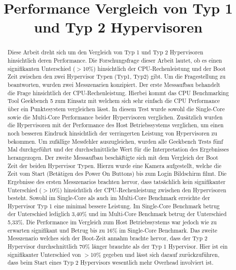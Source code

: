 \documentclass[conference]{IEEEtran}
\begin{document}
\title{Performance Vergleich von Typ 1 und Typ 2 Hypervisoren }

\author
{
}

\maketitle

\begin{abstract}
Diese Arbeit dreht sich um den Vergleich von Typ 1 und Typ 2 Hypervisoren hinsichtlich deren Performance. Die Forschungsfrage dieser Arbeit lautet, ob es einen signifikanten Unterschied ($>$10\%) hinsichtlich der CPU-Rechenleistung und der Boot Zeit zwischen den zwei Hypervisor Typen (Typ1, Typ2) gibt.
Um die Fragestellung zu beantworten, wurden zwei Messzenarien konzipiert. Der erste Messaufbau behandelt die Frage hinsichtlich der CPU-Rechenleistung. Hierbei kommt das CPU Benchmarking Tool Geekbench 5 zum Einsatz mit welchem sich sehr einfach die CPU Performance über ein Punktesystem vergleichen lässt. In diesem Test wurde sowohl die Single-Core sowie die Multi-Core Performance beider Hypervisoren verglichen. Zusätzlich wurden die Hypervisoren mit der Performance des Host Betriebssystems verglichen, um einen noch besseren Eindruck hinsichtlich der verringerten Leistung von Hypervisoren zu bekommen. Um zufällige Messfehler auszugleichen, wurden alle Geekbench Tests fünf Mal durchgeführt und der durchschnittliche Wert für die Interpretation des Ergebnisses herangezogen.
Der zweite Messaufbau beschäftigte sich mit dem Vergleich der Boot Zeit der beiden Hypervisor Typen. Hierzu wurde eine Kamera aufgestellt, welche die Zeit vom Start (Betätigen des Power On Buttons) bis zum Login Bildschirm filmt.
Die Ergebnisse des ersten Messzenarios brachten hervor, dass tatsächlich kein signifikanter Unterschied ($>$10\%) hinsichtlich der CPU-Rechenleistung zwischen den Hypervisoren besteht. Sowohl im Single-Core als auch im Multi-Core Benchmark erreichte der Hypervisor Typ 1 eine minimal bessere Leistung. Im Single-Core Benchmark betrug der Unterschied lediglich 3,40\% und im Multi-Core Benchmark betrug der Unterschied 5,33\%. Die Performance im Vergleich zum Host Betriebssystems war jedoch wie zu erwarten signifikant und Betrug bis zu 16\% im Single-Core Benchmark.
Das zweite Messzenario welches sich der Boot-Zeit annahm brachte hervor, dass der Typ 2 Hypervisor durchschnittlich 70\% länger brauchte als der Typ 1 Hypervisor. Hier ist ein signifikanter Unterschied von $>$10\% gegeben und lässt sich darauf zurückzuführen, dass beim Start eines Typ 2 Hypervisors wesentlich mehr Overhead involviert ist.

\end{abstract}
\end{document}
